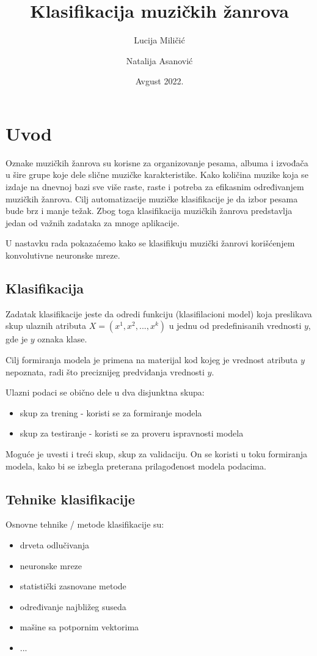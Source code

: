 \documentclass{article}
\title{Klasifikacija muzičkih žanrova}
\author{Lucija Miličić \and Natalija Asanović}
\date{Avgust 2022.}
\begin{document}
\maketitle

\newpage

\section{Uvod}

Oznake muzičkih žanrova su korisne za organizovanje pesama, albuma i izvođača u šire grupe koje dele slične muzičke karakteristike. Kako količina muzike koja se izdaje na dnevnoj bazi sve više raste, raste i potreba za efikasnim određivanjem muzičkih žanrova. Cilj automatizacije muzičke klasifikacije je da izbor pesama bude brz i manje težak. Zbog toga klasifikacija muzičkih žanrova predstavlja jedan od važnih zadataka za mnoge aplikacije.

U nastavku rada pokazaćemo kako se klasifikuju muzički žanrovi korišćenjem konvolutivne neuronske mreze.

\subsection{Klasifikacija}
Zadatak klasifikacije jeste da odredi funkciju (klasifilacioni model) koja preslikava skup ulaznih atributa $X = (x^1, x^2, ..., x^k)$ u jednu od predefinisanih vrednosti $y$, gde je $y$ oznaka klase. 

Cilj formiranja modela je primena na materijal kod kojeg je vrednost atributa $y$ nepoznata, radi što preciznijeg predviđanja vrednosti $y$.

Ulazni podaci se obično dele u dva disjunktna skupa:
\begin{itemize}
    \item skup za trening - koristi se za formiranje modela
    \item skup za testiranje - koristi se za proveru ispravnosti modela
\end{itemize}

Moguće je uvesti i treći skup, skup za validaciju. On se koristi u toku formiranja modela, kako bi se izbegla preterana prilagođenost modela podacima.

\subsection{Tehnike klasifikacije}
Osnovne tehnike / metode klasifikacije su:
\begin{itemize}
    \item drveta odlučivanja
    \item neuronske mreze
    \item statistički zasnovane metode
    \item određivanje najbližeg suseda
    \item mašine sa potpornim vektorima
    \item ...
\end{itemize}
\end{document}
